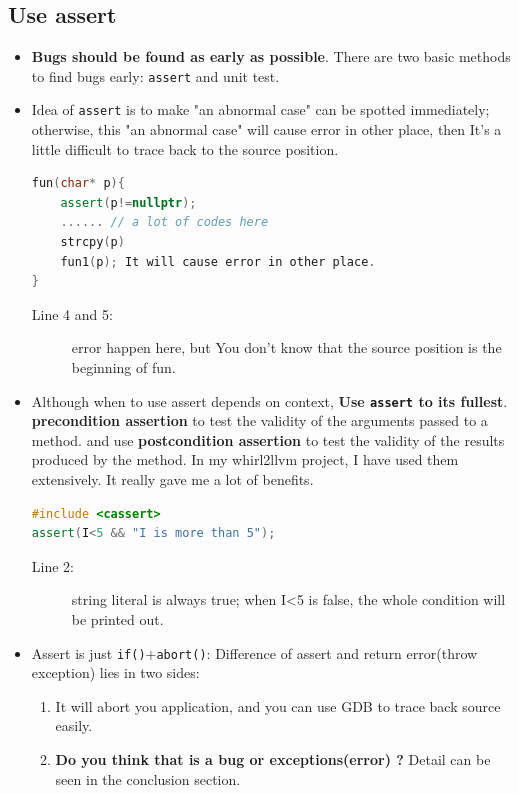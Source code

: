 \documentclass[a4paper,11pt,twoside]{book}
\begin{document}
\subsection{Use assert}
\begin{itemize}
	\item \textbf{Bugs should be found as early as possible}. There are two basic methods to find bugs early: \texttt{assert} and unit test.
	
	\item Idea of \texttt{assert} is to make "an abnormal case" can be spotted immediately; otherwise, this "an abnormal case" will cause error in other place, then It's a little difficult to trace back to the source position.
\begin{lstlisting}[frame=single, language=c++]
fun(char* p){
	assert(p!=nullptr);
	...... // a lot of codes here
	strcpy(p) 
	fun1(p); It will cause error in other place.
}
\end{lstlisting}
\begin{description}
	\item[Line 4 and 5:] error happen here, but You don't know that the source position is the beginning of fun.
\end{description}
	
	\item Although when to use assert depends on context, \textbf{Use \texttt{assert} to its fullest}. \textbf{precondition assertion} to test the validity of the arguments passed to a method. and use \textbf{postcondition assertion} to test the validity of the results produced by the method.  In my whirl2llvm project, I have used them extensively. It really gave me a lot of benefits.
\begin{lstlisting}[frame=single, language=c++]
#include <cassert>
assert(I<5 && "I is more than 5");
\end{lstlisting}
\begin{description}
	\item[Line 2:] string literal is always true; when I<5 is false, the whole condition will be printed out.
\end{description}
	
	\item Assert is just \texttt{if()}+\texttt{abort()}: Difference of assert and return error(throw exception)  lies in two sides: 
	\begin{enumerate}
		\item It will abort you application, and you can use GDB to trace back source easily.
		\item \textbf{Do you think that is a bug or  exceptions(error) ?} Detail can be seen in the conclusion section.
	\end{enumerate}
	

\end{itemize}
\end{document}
